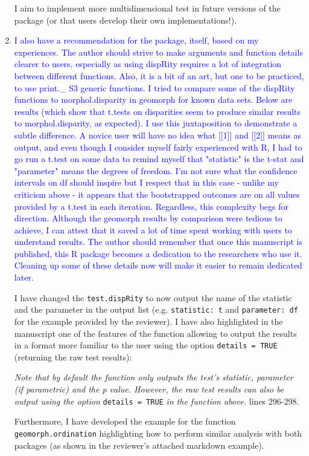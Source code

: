 \documentclass[12pt,letterpaper]{article}
\begin{document}
\begin{enumerate}
I aim to implement more multidimensional test in future versions of the package (or that users develop their own implementations!).

\item{\textcolor{blue}{I also have a recommendation for the package, itself, based on my experiences. 
The author should strive to make arguments and function details clearer to users, especially as using dispRity requires a lot of integration between different functions. 
Also, it is a bit of an art, but one to be practiced, to use print.\_ S3 generic functions. 
I tried to compare some of the dispRity functions to morphol.disparity in geomorph for known data sets. 
Below are results (which show that t.tests on disparities seem to produce similar results to morphol.disparity, as expected). 
I use this juxtaposition to demonstrate a subtle difference. 
A novice user will have no idea what [[1]] and [[2]] means as output, and even though I consider myself fairly experienced with R, I had to go run a t.test on some data to remind myself that "statistic" is the t-stat and "parameter" means the degrees of freedom. 
I'm not sure what the confidence intervals on df should inspire but I respect that in this case - unlike my criticism above - it appears that the bootstrapped outcomes are on all values provided by a t.test in each iteration. 
Regardless, this complexity begs for direction. 
Although the geomorph results by comparison were tedious to achieve, I can attest that it saved a lot of time spent working with users to understand results. 
The author should remember that once this manuscript is published, this R package becomes a dedication to the researchers who use it. 
Cleaning up some of these details now will make it easier to remain dedicated later.}}

I have changed the \texttt{test.dispRity} to now output the name of the statistic and the parameter in the output list (e.g. \texttt{statistic: t} and \texttt{parameter: df} for the example provided by the reviewer).
I have also highlighted in the manuscript one of the features of the function allowing to output the results in a format more familiar to the user using the option \texttt{details = TRUE} (returning the raw test results):

\textit{Note that by default the function only outputs the test's statistic, parameter (if parametric) and the p value. However, the raw test results can also be output using the option} \texttt{details = TRUE} \textit{in the function above.} lines 296-298.

Furthermore, I have developed the example for the function \texttt{geomorph.ordination} highlighting how to perform similar analysis with both packages (as shown in the reviewer's attached markdown example).

\end{enumerate}
\end{document}
